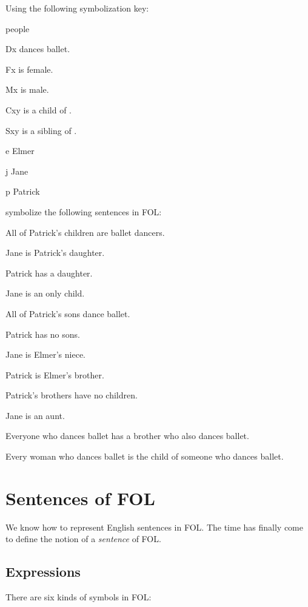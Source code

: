 \solutions
\problempart
\label{pr.FOLballet}
Using the following symbolization key:
\begin{ekey}
\item[\text{domain}] people
\item[Dx]  dances ballet.
\item[Fx]  is female.
\item[Mx]  is male.
\item[Cxy]  is a child of .
\item[Sxy]  is a sibling of .
\item[e] Elmer
\item[j] Jane
\item[p] Patrick
\end{ekey}
symbolize the following sentences in FOL:
\begin{earg}
\item All of Patrick's children are ballet dancers.
\item Jane is Patrick's daughter.
\item Patrick has a daughter.
\item Jane is an only child.
\item All of Patrick's sons dance ballet.
\item Patrick has no sons.
\item Jane is Elmer's niece.
\item Patrick is Elmer's brother.
\item Patrick's brothers have no children.
\item Jane is an aunt.
\item Everyone who dances ballet has a brother who also dances ballet.
\item Every woman who dances ballet is the child of someone who dances ballet.
\end{earg}





\chapter{Sentences of FOL}\label{s:FOLSentences}
We know how to represent English sentences in FOL. The time has finally come to define the notion of a \emph{sentence} of FOL.

\section{Expressions}
There are six kinds of symbols in FOL:

